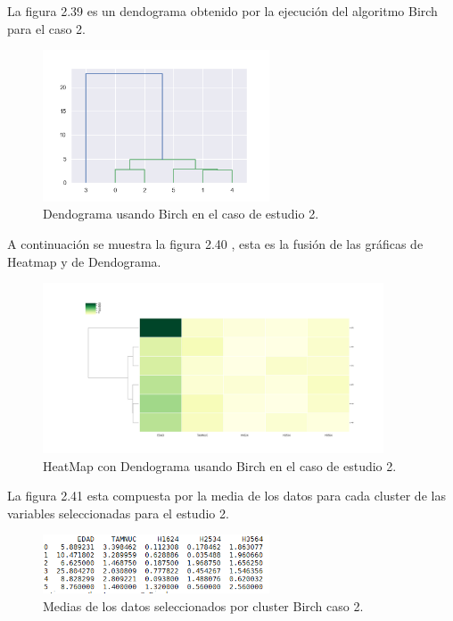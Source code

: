 
	La figura 2.39 es un dendograma obtenido por la ejecución del algoritmo Birch para
	el caso 2. \\

	\begin{figure}[htb]
		\centering
		\includegraphics[width=0.6\textwidth]{./imagenes/caso2/dendograma_caso2_Birch}
		\caption{Dendograma usando Birch en el caso de estudio 2.} \label{fig:1}
	\end{figure}

	A continuación se muestra la figura 2.40 , esta es la fusión de las gráficas de 
	Heatmap y de Dendograma.  \\

	\begin{figure}[htb]
		\centering
		\includegraphics[width=0.9\textwidth]{./imagenes/caso2/heatmapcondendograma_caso2_Birch}
		\caption{HeatMap con Dendograma usando Birch en el caso de estudio 2.} \label{fig:1}
	\end{figure}

	La figura 2.41 esta compuesta por la media de los datos para cada cluster de las variables seleccionadas
	para el estudio 2. \\ 

	\begin{figure}[htb]
		\centering
		\includegraphics[width=0.6\textwidth]{./imagenes/caso2/medias_datos_caso2_Birch}
		\caption{Medias de los datos seleccionados por cluster Birch caso 2.} \label{fig:1}
	\end{figure}


